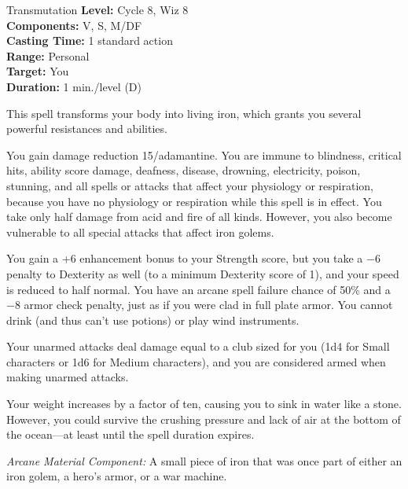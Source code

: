{Transmutation}
{
	\textbf{Level:}
	Cycle 8, Wiz 8\\
	\textbf{Components:}
	V, S, M/DF\\
	\textbf{Casting Time:}
	1 standard action\\
	\textbf{Range:}
	Personal\\
	\textbf{Target:}
	You\\
	\textbf{Duration:}
	1 min./level (D)\\
}
{
	This spell transforms your body into living iron, which grants you several powerful resistances and abilities.

	You gain damage reduction 15/adamantine. You are immune to blindness, critical hits, ability score damage, deafness, disease, drowning, electricity, poison, stunning, and all spells or attacks that affect your physiology or respiration, because you have no physiology or respiration while this spell is in effect. You take only half damage from acid and fire of all kinds. However, you also become vulnerable to all special attacks that affect iron golems.

	You gain a +6 enhancement bonus to your Strength score, but you take a $-6$ penalty to Dexterity as well (to a minimum Dexterity score of 1), and your speed is reduced to half normal. You have an arcane spell failure chance of 50\% and a $-8$ armor check penalty, just as if you were clad in full plate armor. You cannot drink (and thus can't use potions) or play wind instruments.

	Your unarmed attacks deal damage equal to a club sized for you (1d4 for Small characters or 1d6 for Medium characters), and you are considered armed when making unarmed attacks.

	Your weight increases by a factor of ten, causing you to sink in water like a stone. However, you could survive the crushing pressure and lack of air at the bottom of the ocean---at least until the spell duration expires.

	\textit{Arcane Material Component:}
	A small piece of iron that was once part of either an iron golem, a hero's armor, or a war machine.

}

